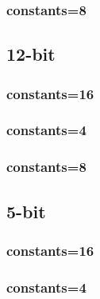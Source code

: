 \documentclass{article}
\begin{document}
\subsubsection*{constants=8}
\begin{figure}[H]
\centering
\resizebox{0.95\linewidth}{!}{}
\end{figure}
\subsection*{12-bit}
\subsubsection*{constants=16}
\begin{figure}[H]
\centering
\resizebox{0.95\linewidth}{!}{}
\end{figure}
\subsubsection*{constants=4}
\begin{figure}[H]
\centering
\resizebox{0.95\linewidth}{!}{}
\end{figure}
\subsubsection*{constants=8}
\begin{figure}[H]
\centering
\resizebox{0.95\linewidth}{!}{}
\end{figure}
\subsection*{5-bit}
\subsubsection*{constants=16}
\begin{figure}[H]
\centering
\resizebox{0.95\linewidth}{!}{}
\end{figure}
\subsubsection*{constants=4}
\begin{figure}[H]
\centering
\resizebox{0.95\linewidth}{!}{}
\end{figure}
\end{document}
